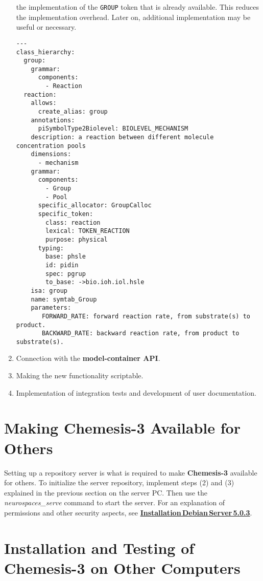 \documentclass[12pt]{article}
\begin{document}
\begin{enumerate}
  the implementation of the {\tt GROUP} token that is already
  available.  This reduces the implementation overhead.  Later on,
  additional implementation may be useful or necessary.
\begin{verbatim}
---
class_hierarchy:
  group:
    grammar:
      components:
        - Reaction
  reaction:
    allows:
      create_alias: group
    annotations:
      piSymbolType2Biolevel: BIOLEVEL_MECHANISM
    description: a reaction between different molecule concentration pools
    dimensions:
      - mechanism
    grammar:
      components:
        - Group
        - Pool
      specific_allocator: GroupCalloc
      specific_token:
        class: reaction
        lexical: TOKEN_REACTION
        purpose: physical
      typing:
        base: phsle
        id: pidin
        spec: pgrup
        to_base: ->bio.ioh.iol.hsle
    isa: group
    name: symtab_Group
    parameters:
       FORWARD_RATE: forward reaction rate, from substrate(s) to product.
       BACKWARD_RATE: backward reaction rate, from product to substrate(s).
\end{verbatim}
\item Connection with the {\bf model-container API}.
\item Making the new functionality scriptable.
\item Implementation of integration tests and development of user
  documentation.
\end{enumerate}


\section*{Making {\bf Chemesis-3} Available for Others}

Setting up a repository server is what is required to make {\bf
  Chemesis-3} available for others.  To initialize the server
repository, implement steps (2) and (3) explained in the previous
section on the server PC.  Then use the {\it neurospaces\_serve}
command to start the server.  For an explanation of permissions and
other security aspects, see
\href{../installation-debian-server/installation-debian-server.html}{\bf
  Installation\,Debian\,Server\,5.0.3}.


\section*{Installation and Testing of {\bf Chemesis-3} on Other Computers}
\end{document}
